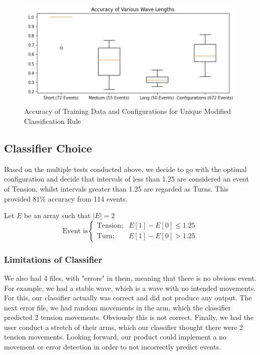 \documentclass[oneside]{article}
\begin{document}
\begin{figure}[H]
  \centering
  \includegraphics[width=12cm]{Pictures/accuracytt.png}
  \caption{Accuracy of Training Data and Configurations for Unique Modified Classification Rule}
 
  \end{figure}
  

\subsection{Classifier Choice}

Based on the multiple tests conducted above, we decide to go with the optimal configuration and decide that intervals of less than 1.25 are considered an event of Tension, whilst intervals greater than 1.25 are regarded as Turns. This provided 81\% accuracy from 114 events.

Let $E$ be an array such that $|E| = 2$
$$
\text{Event is} 
    \begin{cases} 
       \text{Tension}; & E[1] - E[0] \leq 1.25\\
       \text{Turn}; & E[1] - E[0] > 1.25
    \end{cases}
$$
\subsubsection{Limitations of Classifier}

We also had 4 files, with "errors" in them, meaning that there is no obvious event. For example, we had a stable wave, which is a wave with no intended movements. For this, our classifier actually was correct and did not produce any output. The next error file, we had random movements in the arm, which the classifier predicted 2 tension movements. Obviously this is not correct. Finally, we had the user conduct a stretch of their arms, which our classifier thought there were 2 tension movements. Looking forward, our product could implement a no movement or error detection in order to not incorrectly predict events.  
\end{document}
